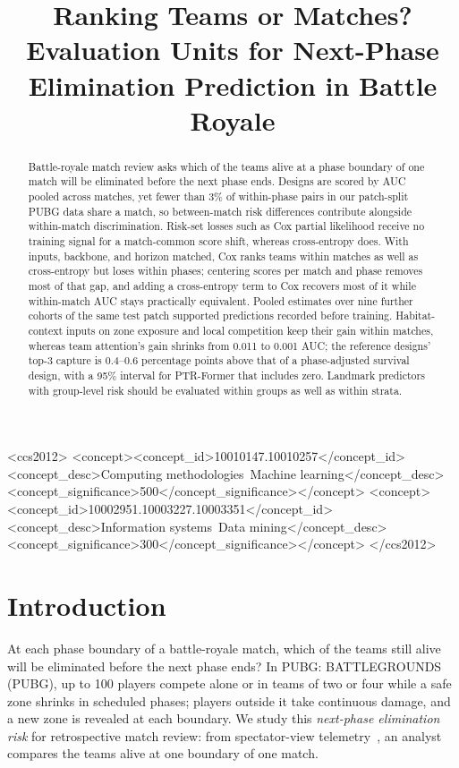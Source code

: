\documentclass[sigconf,anonymous,nonacm]{acmart}
\begin{document}
\title[Evaluation Units for Next-Phase Elimination Prediction]{Ranking Teams or Matches? Evaluation Units for Next-Phase Elimination Prediction in Battle Royale}
\begin{abstract}
Battle-royale match review asks which of the teams alive at a phase boundary of one match will be eliminated before the next phase ends. Designs are scored by AUC pooled across matches, yet fewer than 3\% of within-phase pairs in our patch-split PUBG data share a match, so between-match risk differences contribute alongside within-match discrimination. Risk-set losses such as Cox partial likelihood receive no training signal for a match-common score shift, whereas cross-entropy does. With inputs, backbone, and horizon matched, Cox ranks teams within matches as well as cross-entropy but loses within phases; centering scores per match and phase removes most of that gap, and adding a cross-entropy term to Cox recovers most of it while within-match AUC stays practically equivalent. Pooled estimates over nine further cohorts of the same test patch supported predictions recorded before training. Habitat-context inputs on zone exposure and local competition keep their gain within matches, whereas team attention's gain shrinks from 0.011 to 0.001 AUC; the reference designs' top-3 capture is 0.4--0.6 percentage points above that of a phase-adjusted survival design, with a 95\% interval for PTR-Former that includes zero. Landmark predictors with group-level risk should be evaluated within groups as well as within strata.
\end{abstract}
\begin{CCSXML}
<ccs2012>
<concept><concept_id>10010147.10010257</concept_id><concept_desc>Computing methodologies~Machine learning</concept_desc><concept_significance>500</concept_significance></concept>
<concept><concept_id>10002951.10003227.10003351</concept_id><concept_desc>Information systems~Data mining</concept_desc><concept_significance>300</concept_significance></concept>
</ccs2012>
\end{CCSXML}
\maketitle
\section{Introduction}
\label{sec:introduction}
At each phase boundary of a battle-royale match, which of the teams still alive will be eliminated before the next phase ends? In PUBG: BATTLEGROUNDS (PUBG), up to 100 players compete alone or in teams of two or four while a safe zone shrinks in scheduled phases; players outside it take continuous damage, and a new zone is revealed at each boundary. We study this \emph{next-phase elimination risk} for retrospective match review: from spectator-view telemetry~\cite{PUBGAPI}, an analyst compares the teams alive at one boundary of one match.
\end{document}
